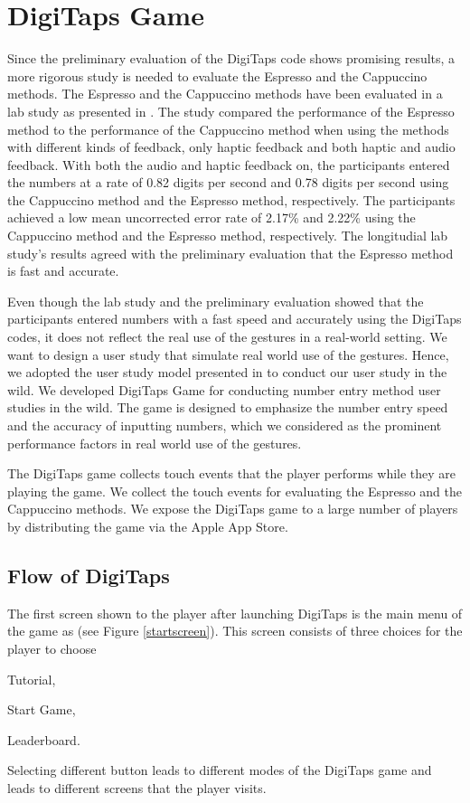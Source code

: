 \section{DigiTaps Game}
\label{sec:digitaps}

Since the preliminary evaluation of the DigiTaps code shows promising results, a more rigorous study is needed to evaluate the Espresso and the Cappuccino methods. The Espresso and the Cappuccino methods have been evaluated in a lab study as presented in \cite{Azenkot:2013}. The study compared the performance of the Espresso method to the performance of the Cappuccino method when using the methods with different kinds of feedback, only haptic feedback and both haptic and audio feedback. With both the audio and haptic feedback on, the participants entered the numbers at a rate of 0.82 digits per second and 0.78 digits per second using the Cappuccino method and the Espresso method, respectively. The participants achieved a low mean uncorrected error rate of 2.17\% and 2.22\% using the Cappuccino method and the Espresso method, respectively. The longitudial lab study's results agreed with the preliminary evaluation that the Espresso method is fast and accurate.
\par
Even though the lab study and the preliminary evaluation showed that the participants entered numbers with a fast speed and accurately using the DigiTaps codes, it does not reflect the real use of the gestures in a real-world setting. We want to design a user study that simulate real world use of the gestures. Hence, we adopted the user study model presented in \cite{Henze:2011} to conduct our user study in the wild. We developed DigiTaps Game for conducting number entry method user studies in the wild. The game is designed to emphasize the number entry speed and the accuracy of inputting numbers, which we considered as the prominent performance factors in real world use of the gestures.
\par
The DigiTaps game collects touch events that the player performs while they are playing the game. We collect the touch events for evaluating the Espresso and the Cappuccino methods. We expose the DigiTaps game to a large number of players by distributing the game via the Apple App Store.

\subsection{Flow of DigiTaps}
The first screen shown to the player after launching DigiTaps is the main menu of the game as (see Figure \ref{startscreen}). This screen consists of three choices for the player to choose
  \begin{enumerate*}[(1) ]
    \item Tutorial, 
    \item Start Game, 
    \item Leaderboard.
  \end{enumerate*}
  Selecting different button leads to different modes of the DigiTaps game and leads to different screens that the player visits.
  
